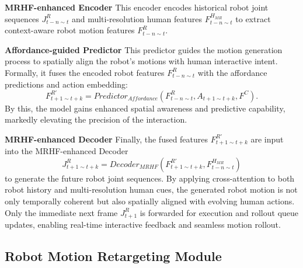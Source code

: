 \noindent\textbf{MRHF-enhanced Encoder} 
This encoder encodes historical robot joint sequences \(J^R_{t-n \sim t}\) and multi-resolution human features \(F^{H_{MR}}_{t-n \sim t}\) to extract context-aware robot motion features $F^{R}_{t-n \sim t} $.


\noindent\textbf{Affordance-guided Predictor} 
This predictor guides the motion generation process to spatially align the robot's motions with human interactive intent. Formally, it fuses the encoded robot features \(F^{R}_{t-n \sim t}\) with the affordance predictions and action embedding:
\[
F^{R'}_{t+1 \sim t+k} = Predictor_{Affordance}(F^{R}_{t-n \sim t}, A_{t+1 \sim t+k},F^{C}).
\]
By this, the model gains enhanced spatial awareness and predictive capability, %
 markedly elevating the precision of the interaction.


\noindent\textbf{MRHF-enhanced Decoder}
Finally, the fused features \(F^{R'}_{t+1 \sim t+k}\) are input into the MRHF-enhanced Decoder 
\[
J^{R}_{t+1 \sim t+k} = Decoder_{MRHF}(F^{R'}_{t+1 \sim t+k}, F^{H_{MR}}_{t-n \sim t})
\]
to generate the future robot joint sequences. 
By applying cross-attention to both robot history and multi-resolution human cues, the generated robot motion is not only temporally coherent but also spatially aligned with evolving human actions.
Only the immediate next frame \(J^{R}_{t+1}\) is forwarded %
for execution and rollout queue updates, enabling real-time interactive feedback and seamless motion rollout.


\subsection{Robot Motion Retargeting Module}

